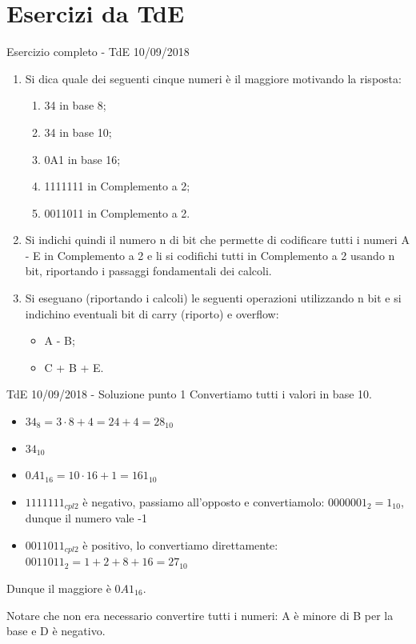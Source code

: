 \documentclass[aspectratio=169, ]{beamer}
\begin{document}
\section{Esercizi da TdE}

\begin{frame}{Esercizio completo - TdE 10/09/2018}
\begin{enumerate}
	\item Si dica quale dei seguenti cinque numeri è il maggiore motivando la risposta:
    \begin{enumerate}
		\item 34 in base 8;
		\item 34 in base 10;
		\item 0A1 in base 16;
		\item 1111111 in Complemento a 2;
		\item 0011011 in Complemento a 2.
	\end{enumerate}

	\item Si indichi quindi il numero n di bit che permette di codificare tutti i numeri A - E in Complemento a 2 e li si codifichi tutti in Complemento a 2 usando n bit, riportando i passaggi fondamentali dei calcoli.

	\item Si eseguano (riportando i calcoli) le seguenti operazioni utilizzando n bit e si indichino eventuali bit di carry (riporto) e overflow:
	\begin{itemize}
		\item A - B;
		\item C + B + E.
	\end{itemize}
\end{enumerate}
\end{frame}

\begin{frame}{TdE 10/09/2018 - Soluzione punto 1}
Convertiamo tutti i valori in base 10.
	\begin{itemize}
		\item $34_8 = 3 \cdot 8 +  4 = 24+4 = 28_{10}$
		\item $34_{10}$
		\item $0A1_{16} = 10 \cdot 16 + 1 = 161_{10}$
		\item $1111111_{cpl2}$ è negativo, passiamo all'opposto e convertiamolo: $0000001_2 = 1_{10}$, dunque il numero vale -1
		\item $0011011_{cpl2}$ è positivo, lo convertiamo direttamente: $0011011_2 = 1+2+8+16 = 27_{10}$
	\end{itemize}

Dunque il maggiore è $0A1_{16}$.

Notare che non era necessario convertire tutti i numeri: A è minore di B per la base e D è negativo.
\end{frame}
\end{document}
